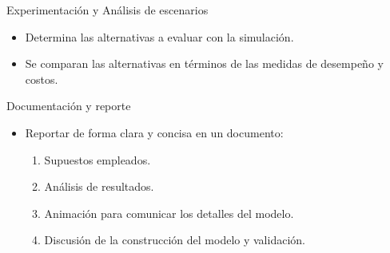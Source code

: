 \begin{frame}{Experimentación y Análisis de escenarios}
    \begin{itemize}
        \item Determina las alternativas a evaluar con la simulación.
        \item Se comparan las alternativas en términos de las medidas de desempeño y costos.
    \end{itemize}
\end{frame}

\begin{frame}{Documentación y reporte}
    \begin{itemize}
        \item Reportar de forma clara y concisa en un documento:
        \begin{enumerate}
            \item Supuestos empleados.
            \item Análisis de resultados.
            \item Animación para comunicar los detalles del modelo.
            \item Discusión de la construcción del modelo y validación.
        \end{enumerate}
    \end{itemize}
\end{frame}